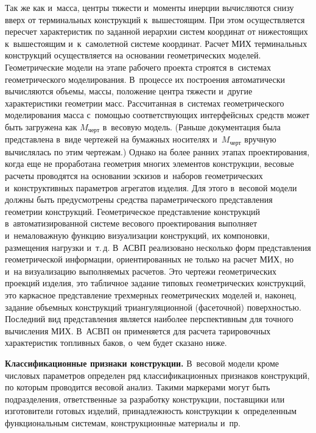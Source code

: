 \begin{multicols}{2}
  Так же как и~масса, центры тяжести и~моменты инерции вычисляются снизу
вверх от терминальных конструкций к~вышестоящим. При этом осуществляется 
пересчет характеристик по заданной иерархии систем координат от 
нижестоящих к~вышестоящим и~к~самолетной системе координат. Расчет 
МИХ терминальных конструкций 
осуществляется на основании гео\-мет\-ри\-че\-ских моделей. Геометрические модели 
на этапе рабочего проекта строятся в~системах гео\-мет\-ри\-че\-ско\-го 
моделирования. В~процессе их построения автоматически вычисляются 
объемы, массы, положение центра тяжести и~другие характеристики гео\-мет\-рии 
масс. Рассчитанная в~системах гео\-мет\-ри\-че\-ско\-го моделирования масса 
с~по\-мощью соответствующих интерфейсных средств может быть загружена как 
$M_{\mathrm{черт}}$ в~весовую модель. (Раньше документация была представлена в~виде 
чертежей на бумажных носителях и~$M_{\mathrm{черт}}$ вручную вычислялась по этим 
чертежам.) Однако на более ранних этапах проектирования, когда еще не 
проработана гео\-мет\-рия многих элементов конструкции, весовые расчеты 
проводятся на основании эскизов и~наборов гео\-мет\-ри\-че\-ских и~конструктивных 
параметров агрегатов изделия. Для этого в~весовой модели должны быть 
предусмотрены средства параметрического представления гео\-мет\-рии 
конструкций. Геометрическое пред\-став\-ле\-ние конструкций 
в~автоматизированной системе весового проектирования выполняет 
и~немаловажную функцию визуализации конструкций, их компоновки, 
размещения нагрузки и~т.\,д. В~АСВП реализовано несколько форм 
представления гео\-мет\-ри\-че\-ской информации, ориентированных не только на 
расчет МИХ, но и~на визуализацию выполняемых расчетов. Это чертежи 
геометрических проекций изделия, это таб\-лич\-ное задание типовых 
геометрических конструкций, это каркасное представление трехмерных 
геометрических моделей и, наконец, задание объемных конструкций 
триангуляционной (фасеточной) поверхностью. Последний вид представления 
является наиболее перспективным для точного вычисления МИХ. В~АСВП он 
применяется для расчета тарировочных характеристик топливных баков, о~чем 
будет сказано ниже.
  
  \textbf{Классификационные признаки конструкции.} В~весовой модели 
кроме числовых параметров опре\-делен ряд классификационных признаков 
конструкций, по которым проводится весовой анализ.\linebreak
 Таки\-ми маркерами могут 
быть подразделения, ответст\-вен\-ные за разработку конструкции, поставщики 
или изготовители готовых изделий, принадлежность конструкции 
к~определенным функциональным системам, конструкционные материалы 
и~пр.
  

\end{multicols}
